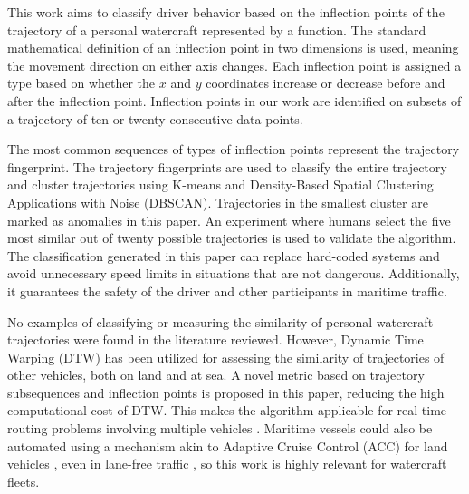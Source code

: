 \documentclass[preprint,12pt]{elsarticle}
\begin{document}
This work aims to classify driver behavior based on the inflection points of the trajectory of a personal watercraft represented by a function. The standard mathematical definition of an inflection point in two dimensions is used, meaning the movement direction on either axis changes. Each inflection point is assigned a type based on whether the $x$ and $y$ coordinates increase or decrease before and after the inflection point. Inflection points in our work are identified on subsets of a trajectory of ten or twenty consecutive data points.

The most common sequences of types of inflection points represent the trajectory fingerprint. The trajectory fingerprints are used to classify the entire trajectory and cluster trajectories using K-means and Density-Based Spatial Clustering Applications with Noise (DBSCAN). Trajectories in the smallest cluster are marked as anomalies in this paper. An experiment where humans select the five most similar out of twenty possible trajectories is used to validate the algorithm. The classification generated in this paper can replace hard-coded systems and avoid unnecessary speed limits in situations that are not dangerous. Additionally, it guarantees the safety of the driver and other participants in maritime traffic.
 
No examples of classifying or measuring the similarity of personal watercraft trajectories were found in the literature reviewed. However, Dynamic Time Warping (DTW) has been utilized for assessing the similarity of trajectories \cite{2017Fu, 2021Pedroche} of other vehicles, both on land and at sea. A novel metric based on trajectory subsequences and inflection points is proposed in this paper, reducing the high computational cost of DTW. This makes the algorithm applicable for real-time routing problems involving multiple vehicles \cite{BERTAZZI2025104892}. Maritime vessels could also be automated using a mechanism akin to Adaptive Cruise Control (ACC) for land vehicles \cite{YU2025104931, GUAN2025104914}, even in lane-free traffic \cite{BEZA2025104898}, so this work is highly relevant for watercraft fleets.
\end{document}
